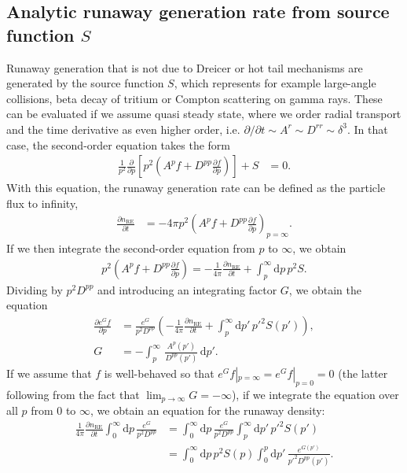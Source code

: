 \documentclass[11pt,a4paper]{article}
\newcommand{\rd}{\ensuremath{\mathrm{d}}}
\newcommand{\sub}[1]{\ensuremath{_{\text{#1}}}}
\begin{document}
\subsection{Analytic runaway generation rate from source function $S$}
Runaway generation that is not due to Dreicer or hot tail mechanisms are generated by the source function $S$, which represents for example large-angle collisions, beta decay of tritium or Compton scattering on gamma rays. These can be evaluated if we assume quasi steady state, where we order radial transport and the time derivative as even higher order, i.e. $\partial/\partial t \sim A^r \sim D^{rr} \sim \delta^3$. In that case, the second-order equation takes the form
\begin{align}
\frac{1}{p^2}\frac{\partial}{\partial p}\left[ p^2\left(A^pf + D^{pp}\frac{\partial f}{\partial p}\right)\right] + S &= 0.
\end{align}
With this equation, the runaway generation rate can be defined as the particle flux to infinity,
\begin{align}
\frac{\partial n\sub{RE}}{\partial t} &= -4\pi p^2\left(A^pf + D^{pp}\frac{\partial f}{\partial p}\right)_{\!\!p=\infty}.
\end{align}
If we then integrate the second-order equation from $p$ to $\infty$, we obtain
\begin{align}
 p^2\left(A^pf + D^{pp}\frac{\partial f}{\partial p}\right) = -\frac{1}{4\pi}\frac{\partial n\sub{RE}}{\partial t} + \int_p^\infty \rd p \, p^2S .
\end{align}
Dividing by $p^2 D^{pp}$ and introducing an integrating factor $G$, we obtain the equation
\begin{align}
\frac{\partial e^Gf}{\partial p} &= \frac{ e^G}{p^2 D^{pp}}\left(-\frac{1}{4\pi}\frac{\partial n\sub{RE}}{\partial t} + \int_p^\infty \rd p' \, p'^2S(p')\right), \nonumber \\
G &= -\int_p^\infty \,\frac{A^p(p')}{D^{pp}(p')}\,\rd p'.
\end{align}
If we assume that $f$ is well-behaved so that $e^G f|_{p=\infty} = e^G f|_{p=0} = 0$ (the latter following from the fact that $\lim_{p\to\infty} G = -\infty$), if we integrate the equation over all $p$ from 0 to $\infty$, we obtain an equation for the runaway density:
\begin{align}
\frac{1}{4\pi} \frac{\partial n\sub{RE}}{\partial t} \int_0^\infty \rd p \,\frac{e^G}{p^2 D^{pp}} &= \int_0^\infty \rd p \, \frac{e^G}{p^2 D^{pp}} \int_p^\infty \rd p' \, p'^2S(p') \nonumber \\
&=\int_0^\infty \rd p \, p^2S(p) \int_0^p \rd p' \, \frac{e^{G(p')}}{p'^2 D^{pp}(p')}.
\end{align}
\end{document}
